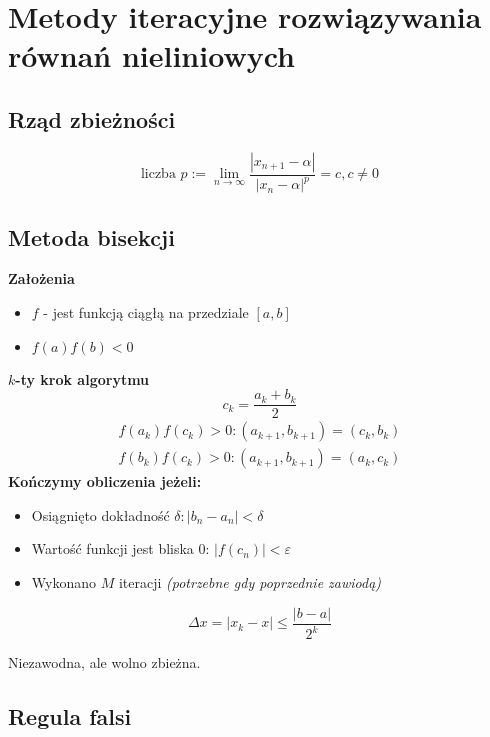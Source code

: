 \documentclass[../mn-notatki.tex]{subfiles}
\begin{document}
\section{Metody iteracyjne rozwiązywania równań nieliniowych}

\subsection{Rząd zbieżności}
\begin{tcolorbox}
\[
\text{liczba } p := \lim_{n \to \infty} \frac{|x_{n+1} - \alpha|}{|x_n - \alpha|^p} = c, c \neq 0
\]
\end{tcolorbox}

\subsection{Metoda bisekcji}

\begin{tcolorbox}
\textbf{Założenia}
\begin{itemize}
    \item $f$ - jest funkcją ciągłą na przedziale $[a,b]$
    \item $f(a)f(b) < 0$\\
\end{itemize}

\textbf{$k$-ty krok algorytmu}
\[
c_k = \frac{a_k + b_k}{2}
\]
\begin{gather*}
f(a_k)f(c_k) > 0 : (a_{k+1}, b_{k+1}) = (c_k, b_k)\\
f(b_k)f(c_k) > 0 : (a_{k+1}, b_{k+1}) = (a_k, c_k)
\end{gather*}
\textbf{Kończymy obliczenia jeżeli:}
\begin{itemize}
    \item Osiągnięto dokładność $\delta: |b_n - a_n| < \delta$
    \item Wartość funkcji jest bliska $0$: $|f(c_n)| < \varepsilon$
    \item Wykonano $M$ iteracji \textit{(potrzebne gdy poprzednie zawiodą)}\\
\end{itemize}
\[
\Delta x = |x_k - x| \leqslant \frac{|b - a|}{2^k}
\]

Niezawodna, ale wolno zbieżna.
\end{tcolorbox}

\subsection{Regula falsi}
\end{document}
